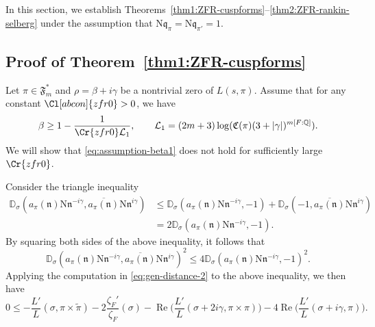 \documentclass[12pt,reqno]{amsart}
\renewcommand{\tilde}{\widetilde}
\theoremstyle{remark}
\renewcommand{\tilde}{\widetilde}
\DeclareMathOperator{\Real}{Re}
\renewcommand{\tilde}{\widetilde}
\newcommand{\N}{\mathrm{N}}
\newcommand{\Q}{\mathbb{Q}}
\newcommand{\kq}{\mathfrak{q}}
\newcommand{\kn}{\mathfrak{n}}
\numberwithin{equation}{section}
\begin{document}
    In this section, we establish Theorems~\ref{thm1:ZFR-cuspforms}--\ref{thm2:ZFR-rankin-selberg} under the assumption that $\N\kq_{\pi} = \N\kq_{\pi'} = 1$. 

    	\subsection{Proof of Theorem~\ref{thm1:ZFR-cuspforms}}\label{subsec:proof-level1-thm1}
	
	Let $\pi\in\mathfrak{F}_m^*$ and $\rho = \beta +i\gamma$ be a nontrivial zero of $L(s, \pi)$. 
	Assume that for any constant $\Cl[abcon]{zfr0} > 0$, we have
	\begin{equation}\label{eq:assumption-beta1}
		\begin{aligned}
			\beta
			\ge 1- \frac{1}{\Cr{zfr0}\mathcal{L}_1}, \qquad \mathcal{L}_1 = (2m+3)\log(\mathfrak{C}(\pi) (3+|\gamma|)^{m[F:\Q]}).
		\end{aligned}
	\end{equation}
	We will show that \eqref{eq:assumption-beta1} does not hold for sufficiently large $\Cr{zfr0}$. 
    
    Consider the triangle inequality
	\begin{equation*}
		\begin{aligned}
			\mathbb{D}_{\sigma}(a_{\pi}(\kn)\N\kn^{-i\gamma}, \overline{a_{\pi}(\kn)}\N\kn^{i\gamma}) &\le 
			\mathbb{D}_{\sigma}( a_{\pi}(\kn)\N\kn^{-i\gamma}, -1) + \mathbb{D}_{\sigma}(-1, \overline{a_{\pi}(\kn)}\N\kn^{i\gamma})\\
			&= 2\mathbb{D}_{\sigma}( a_{\pi}(\kn)\N\kn^{-i\gamma},-1).
		\end{aligned}
	\end{equation*}
	By squaring both sides of the above inequality, it follows that
	\begin{equation*}
		\mathbb{D}_{\sigma}(a_{\pi}(\kn)\N\kn^{-i\gamma}, \overline{a_{\pi}(\kn)}\N\kn^{i\gamma})^2 \le  4\mathbb{D}_{\sigma}( a_{\pi}(\kn)\N\kn^{-i\gamma},-1)^2.
	\end{equation*}
	Applying the computation in \eqref{eq:gen-distance-2} to the above inequality, we then have
	\begin{equation}\label{eq:thm1-eq1}
		0 \le -\frac{L'}{L}(\sigma, \pi\times \tilde{\pi})-2\frac{\zeta_F'}{\zeta_F}(\sigma) -\Real\Big(\frac{L'}{L}(\sigma+2i\gamma, \pi \times \pi)\Big)-4\Real\Big(\frac{L'}{L}(\sigma+i\gamma, \pi)\Big).
	\end{equation}
	
\end{document}
